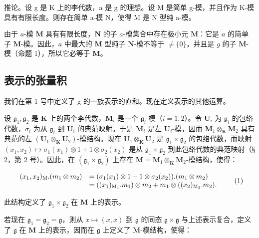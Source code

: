 推论。设 g 是 K 上的李代数，a 是 g 的理想。设 M 是简单 g-模，并且作为 K-模具有有限长度。则存在简单 a-模 N，使得 M 是 N 型纯 a-模。

由于 \(a\)-模 \(\mathbf{M}\) 具有有限长度，\(\mathbf{N}\) 的子 \(a\)-模集合中存在极小元 \(\mathbf{M}\)：它是 \(a\) 的简单子 \(\mathbf{M}\)-模。因此，\(a\) 中最大的 \(\mathbf{M}\) 型纯子 \(\mathbf{N}\)-模不等于 \(\neq \{0\}\)，并且是 \(g\) 的子 \(\mathbf{M}\)-模（命题 1），所以它必等于 \(\mathbf{M}\)。

\subsection{表示的张量积}

我们在第 1 号中定义了 g 的一族表示的直和。现在定义表示的其他运算。

设 \(\mathfrak{g}_1, \mathfrak{g}_2\) 是 \(\mathbf{K}\) 上的两个李代数，\(\mathbf{M}_i\) 是一个 \(\mathfrak{g}_i\)-模（\(i = 1, 2\)）。令 \(\mathbf{U}_i\) 为 \(\mathfrak{g}_i\) 的包络代数，\(\sigma_i\) 为从 \(\mathfrak{g}_i\) 到 \(\mathbf{U}_i\) 的典范映射。于是 \(\mathbf{M}_i\) 是左 \(\mathbf{U}_i\)-模，因而 \(\mathbf{M}_1 \otimes_{\mathbf{K}} \mathbf{M}_2\) 具有典范的左 \((\mathbf{U}_1 \otimes_{\mathbf{K}} \mathbf{U}_2)\)-模结构。现在 \(\mathbf{U}_1 \otimes_{\mathbf{K}} \mathbf{U}_2\) 是 \(\mathfrak{g}_1 \times \mathfrak{g}_2\) 的包络代数，而映射 \((x_1, x_2) \mapsto \sigma_1(x_1) \otimes 1 + 1 \otimes \sigma_2(x_2)\) 是从 \(\mathfrak{g}_1 \times \mathfrak{g}_2\) 到此包络代数的典范映射（§ 2，第 2 号）。因此，在 \((\mathfrak{g}_1 \times \mathfrak{g}_2)\) 上存在 \(\mathbf{M} = \mathbf{M}_1 \otimes_{\mathbf{K}} \mathbf{M}_2\)-模结构，使得：

\[
\begin{array}{r l} (x _ {1}, x _ {2}) _ {\mathrm{M}}. (m _ {1} \otimes m _ {2}) & = (\sigma_ {1} (x _ {1}) \otimes 1 + 1 \otimes \sigma_ {2} (x _ {2})) . (m _ {1} \otimes m _ {2}) \\ & = ((x _ {1}) _ {\mathrm{M} _ {1}}. m _ {1}) \otimes m _ {2} + m _ {1} \otimes ((x _ {2}) _ {\mathrm{M} _ {2}}. m _ {2}). \end{array}\tag{1}
\]

此结构定义了 \(\mathfrak{g}_1\times \mathfrak{g}_2\) 在 \(\mathbf{M}\) 上的表示。

若现在 \(\mathfrak{g}_1 = \mathfrak{g}_2 = \mathfrak{g}\)，则从 \(x \mapsto (x, x)\) 到 \(\mathfrak{g}\) 的同态 \(\mathfrak{g} \times \mathfrak{g}\) 与上述表示复合，定义了 \(\mathfrak{g}\) 在 \(\mathbf{M}\) 上的表示，因而在 \(\mathfrak{g}\) 上定义了 \(\mathbf{M}\)-模结构，使得：

